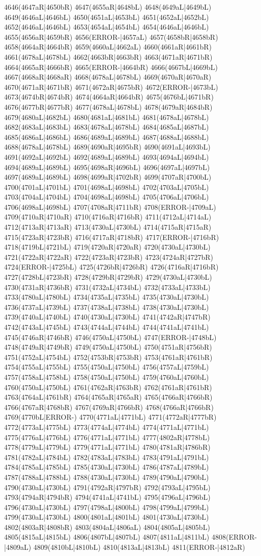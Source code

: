 4646(4647aR|4650bR) 4647(4655aR|4648bL) 4648(4649aL|4649bL) 4649(4646aL|4646bL) 4650(4651aL|4653bL) 4651(4652aL|4652bL) 4652(4646aL|4646bL) 4653(4654aL|4654bL) 4654(4646aL|4646bL) 4655(4656aR|4659bR) 4656(ERROR-|4657aL) 4657(4658bR|4658bR) 4658(4664aR|4664bR) 4659(4660aL|4662aL) 4660(4661aR|4661bR) 4661(4678aL|4678bL) 4662(4663bR|4663bR) 4663(4671aR|4671bR) 4664(4665aR|4666bR) 4665(ERROR-|4664bR) 4666(4667bL|4669bL) 4667(4668aR|4668aR) 4668(4678aL|4678bL) 4669(4670aR|4670aR) 4670(4671aR|4671bR) 4671(4672aR|4675bR) 4672(ERROR-|4673bL) 4673(4674bR|4674bR) 4674(4664aR|4664bR) 4675(4676bL|4671bR) 4676(4677bR|4677bR) 4677(4678aL|4678bL) 4678(4679aR|4684bR) 4679(4680aL|4682bL) 4680(4681aL|4681bL) 4681(4678aL|4678bL) 4682(4683aL|4683bL) 4683(4678aL|4678bL) 4684(4685aL|4687bL) 4685(4686aL|4686bL) 4686(4689aL|4689bL) 4687(4688aL|4688bL) 4688(4678aL|4678bL) 4689(4690aR|4695bR) 4690(4691aL|4693bL) 4691(4692aL|4692bL) 4692(4689aL|4689bL) 4693(4694aL|4694bL) 4694(4689aL|4689bL) 4695(4698aR|4696bL) 4696(4697aL|4697bL) 4697(4689aL|4689bL) 4698(4699aR|4702bR) 4699(4707aR|4700bL) 4700(4701aL|4701bL) 4701(4698aL|4698bL) 4702(4703aL|4705bL) 4703(4704aL|4704bL) 4704(4698aL|4698bL) 4705(4706aL|4706bL) 4706(4698aL|4698bL) 4707(4708aR|4711bR) 4708(ERROR-|4709aL) 4709(4710aR|4710aR) 4710(4716aR|4716bR) 4711(4712aL|4714aL) 4712(4713aR|4713aR) 4713(4730aL|4730bL) 4714(4715aR|4715aR) 4715(4723aR|4723bR) 4716(4717aR|4718bR) 4717(ERROR-|4716bR) 4718(4719bL|4721bL) 4719(4720aR|4720aR) 4720(4730aL|4730bL) 4721(4722aR|4722aR) 4722(4723aR|4723bR) 4723(4724aR|4727bR) 4724(ERROR-|4725bL) 4725(4726bR|4726bR) 4726(4716aR|4716bR) 4727(4728bL|4723bR) 4728(4729bR|4729bR) 4729(4730aL|4730bL) 4730(4731aR|4736bR) 4731(4732aL|4734bL) 4732(4733aL|4733bL) 4733(4780aL|4780bL) 4734(4735aL|4735bL) 4735(4730aL|4730bL) 4736(4737aL|4739bL) 4737(4738aL|4738bL) 4738(4730aL|4730bL) 4739(4740aL|4740bL) 4740(4730aL|4730bL) 4741(4742aR|4747bR) 4742(4743aL|4745bL) 4743(4744aL|4744bL) 4744(4741aL|4741bL) 4745(4746aR|4746bR) 4746(4750aL|4750bL) 4747(ERROR-|4748bL) 4748(4749aR|4749bR) 4749(4750aL|4750bL) 4750(4751aR|4756bR) 4751(4752aL|4754bL) 4752(4753bR|4753bR) 4753(4761aR|4761bR) 4754(4755aL|4755bL) 4755(4750aL|4750bL) 4756(4757aL|4759bL) 4757(4758aL|4758bL) 4758(4750aL|4750bL) 4759(4760aL|4760bL) 4760(4750aL|4750bL) 4761(4762aR|4763bR) 4762(4761aR|4761bR) 4763(4764aL|4761bR) 4764(4765aR|4765aR) 4765(4766aR|4766bR) 4766(4767aR|4768bR) 4767(4769aR|4766bR) 4768(4766aR|4766bR) 4769(4770bL|ERROR-) 4770(4771aL|4771bL) 4771(4772aR|4777bR) 4772(4773aL|4775bL) 4773(4774aL|4774bL) 4774(4771aL|4771bL) 4775(4776aL|4776bL) 4776(4771aL|4771bL) 4777(4802aR|4778bL) 4778(4779aL|4779bL) 4779(4771aL|4771bL) 4780(4781aR|4786bR) 4781(4782aL|4784bL) 4782(4783aL|4783bL) 4783(4791aL|4791bL) 4784(4785aL|4785bL) 4785(4730aL|4730bL) 4786(4787aL|4789bL) 4787(4788aL|4788bL) 4788(4730aL|4730bL) 4789(4790aL|4790bL) 4790(4730aL|4730bL) 4791(4792aR|4797bR) 4792(4793aL|4795bL) 4793(4794aR|4794bR) 4794(4741aL|4741bL) 4795(4796aL|4796bL) 4796(4730aL|4730bL) 4797(4798aL|4800bL) 4798(4799aL|4799bL) 4799(4730aL|4730bL) 4800(4801aL|4801bL) 4801(4730aL|4730bL) 4802(4803aR|4808bR) 4803(4804aL|4806aL) 4804(4805aL|4805bL) 4805(4815aL|4815bL) 4806(4807bL|4807bL) 4807(4811aL|4811bL) 4808(ERROR-|4809aL) 4809(4810bL|4810bL) 4810(4813aL|4813bL) 4811(ERROR-|4812aR) 